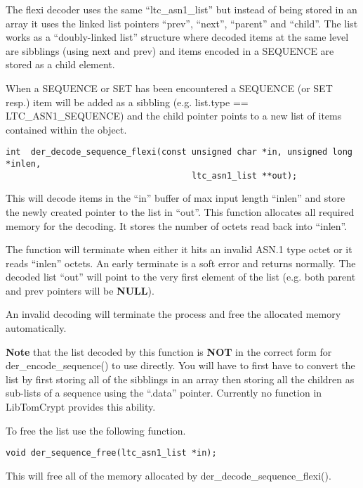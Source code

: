 \documentclass[a4paper]{book}
\begin{document}
The flexi decoder uses the same ``ltc\_asn1\_list'' but instead of being stored in an array it uses the linked list pointers ``prev'', ``next'', ``parent'' 
and ``child''.  The list works as a ``doubly-linked list'' structure where decoded items at the same level are sibblings (using next and prev) and items
encoded in a SEQUENCE are stored as a child element.

When a SEQUENCE or SET has been encountered a SEQUENCE (or SET resp.) item will be added as a sibbling (e.g. list.type == LTC\_ASN1\_SEQUENCE) and the child 
pointer points to a new list of items contained within the object.

\begin{verbatim}
int  der_decode_sequence_flexi(const unsigned char *in, unsigned long *inlen, 
                                     ltc_asn1_list **out);
\end{verbatim}

This will decode items in the ``in'' buffer of max input length ``inlen'' and store the newly created pointer to the list in ``out''.  This function allocates
all required memory for the decoding.  It stores the number of octets read back into ``inlen''.

The function will terminate when either it hits an invalid ASN.1 type octet or it reads ``inlen'' octets.  An early terminate is a soft error and returns
normally.  The decoded list ``out'' will point to the very first element of the list (e.g. both parent and prev pointers will be \textbf{NULL}).  

An invalid decoding will terminate the process and free the allocated memory automatically.  

\textbf{Note} that the list decoded by this function is \textbf{NOT} in the correct form for der\_encode\_sequence() to use directly.  You will have to first 
have to convert the list by first storing all of the sibblings in an array then storing all the children as sub-lists of a sequence using the ``.data'' 
pointer.  Currently no function in LibTomCrypt provides this ability.

To free the list use the following function.

\begin{verbatim}
void der_sequence_free(ltc_asn1_list *in);
\end{verbatim}

This will free all of the memory allocated by der\_decode\_sequence\_flexi().
\end{document}
